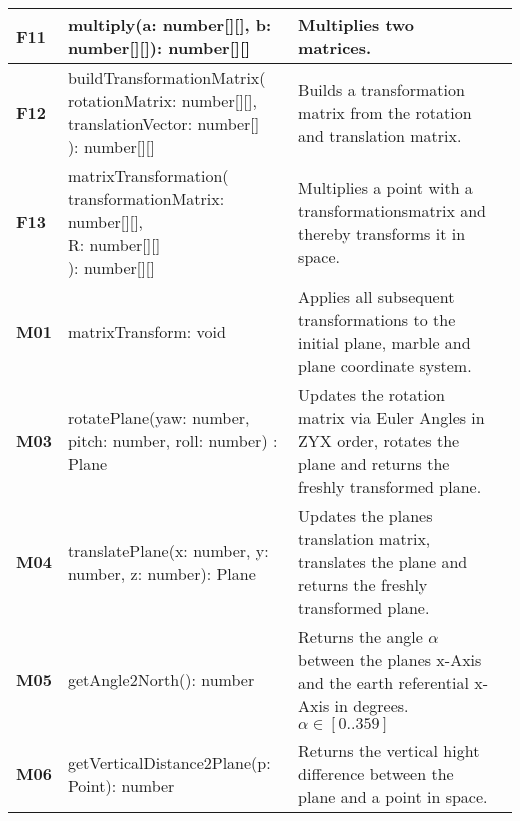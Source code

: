 \begin{xltabular}{\textwidth}{|M{1.2cm}|X|X|M{3cm}|}
  \textbf{F11} & {\ttfamily multiply(a: number[][], b: number[][]): number[][]} & Multiplies two matrices. &  \\ \hline 
  \textbf{F12} & {\ttfamily buildTransformationMatrix( \newline rotationMatrix: number[][], \newline  translationVector: number[] \newline ): number[][]} & Builds a transformation matrix from the rotation and translation matrix. &  \\ \hline 
  \textbf{F13} & {\ttfamily matrixTransformation( \newline transformationMatrix: number[][], \newline R: number[][] \newline ): number[][]} & Multiplies a point with a transformationsmatrix and thereby transforms it in space. &  \\ \hline 
  \textbf{M01} & {\ttfamily matrixTransform: void } & Applies all subsequent transformations to the initial plane, marble and plane coordinate system. &  \\ \hline 
  \textbf{M03} & {\ttfamily rotatePlane(yaw: number, pitch: number, roll: number) : Plane} & Updates the rotation matrix via Euler Angles in ZYX order, rotates the plane and returns the freshly transformed plane. &  \\ \hline 
  \textbf{M04} & {\ttfamily translatePlane(x: number, y: number, z: number): Plane} & Updates the planes translation matrix, translates the plane and returns the freshly transformed plane. &  \\ \hline 
  \textbf{M05} & {\ttfamily getAngle2North(): number} & Returns the angle $\alpha$ between the planes x-Axis and the earth referential x-Axis in degrees. $\alpha\in\left[0..359\right]$ &  \\ \hline 
  \textbf{M06} & {\ttfamily getVerticalDistance2Plane(p: Point): number} & Returns the vertical hight difference between the plane and a point in space. &  \\ \hline 

\end{xltabular}
